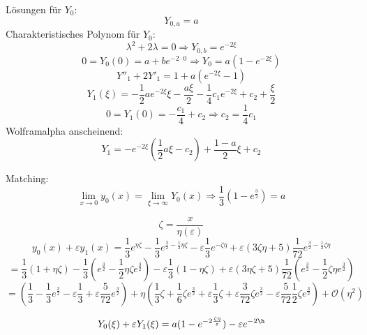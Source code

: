 \documentclass[a4paper,11pt]{scrartcl}
\newcommand*{\eps}{\varepsilon}
\newcommand*{\Ld}{\mathcal{O}}
\begin{document}
\begin{enumerate}[label*=\textbf{8.\arabic*.}]
\begin{enumerate}
    Lösungen für $Y_0$:
    \[ Y_{0, a} = a\]
    Charakteristisches Polynom für $Y_0$:
    \[\lambda^2 + 2 \lambda = 0 \Rightarrow Y_{0, b} = e^{-2\xi}\]
    \[0 = Y_0(0) = a + b e^{-2 \cdot 0} \Rightarrow Y_0 = a (1 - e^{-2\xi}) \]
    \[Y''_1 + 2 Y'_1 = 1 + a (e^{-2 \xi} - 1)\]
    \[Y_1(\xi) = -\frac{1}{2} a e^{-2\xi} \xi - \frac{a\xi}{2} -\frac{1}{4} c_1
      e^{-2 \xi} + c_2 + \frac{\xi}{2} \]
    \[0= Y_1(0) = -\frac{c_1}{4} + c_2 \Rightarrow c_2 = \frac{1}{4} c_1\]
    Wolframalpha anscheinend:
    \[Y_1 = -e^{-2\xi} \left(\frac{1}{2}a \xi - c_2\right) + \frac{1-a}{2} \xi
      + c_2\]

    Matching:
    \[\lim_{x\rightarrow 0} y_0(x) = \lim_{\xi \rightarrow \infty} Y_0(x)
      \Rightarrow \frac{1}{3}( 1 -e^{\frac{3}{2}}) = a\]

    \[\zeta = \frac{x}{\eta(\eps)}\]
    \[y_0(x) + \eps y_1(x) = \frac{1}{3} e^{\eta\zeta} - \frac{1}{3}
      e^{\frac{3}{2} - \frac{1}{2}\eta\zeta} - \eps \frac{1}{3} e^{-\zeta
        \eta}+ \eps(3 \zeta \eta + 5) \frac{1}{72} e^{\frac{3}{2} - \frac{1}{2}
        \zeta \eta}\]
    \[ = \frac{1}{3} (1 + \eta \zeta) - \frac{1}{3} (e^{\frac{3}{2}}
      -\frac{1}{2} \eta \zeta e^{\frac{3}{2}}) - \eps \frac{1}{3} (1 - \eta
      \zeta) + \eps (3 \eta \zeta + 5) \frac{1}{72} (e^{\frac{3}{2}}
      -\frac{1}{2} \zeta \eta e^{\frac{3}{2}}) \]
    \[= \left(\frac{1}{3} -\frac{1}{3} e^{\frac{3}{2}} - \eps \frac{1}{3} + \eps
        \frac{5}{72} e^{\frac{3}{2}}\right)
    + \eta\left( \frac{1}{3} \zeta + \frac{1}{6} \zeta
        e^{\frac{3}{2}} + \eps \frac{1}{3} \zeta + \eps \frac{3}{72} \zeta
        e^{\frac{3}{2}} - \eps \frac{5}{72} \frac{1}{2}\zeta e^{\frac{3}{2}}
      \right) + \Ld(\eta^2) \]

    \[Y_0(\xi)+\eps Y_1(\xi) = a (1 - e^{-2 \frac{\zeta \eta}{\eps}}) - \eps e^{-2\h}  \]
      


\end{enumerate}


\end{enumerate}
\end{document}
